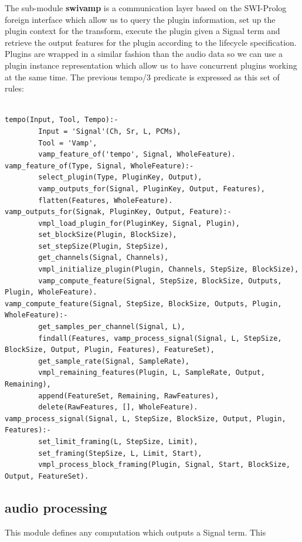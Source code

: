 \documentclass{llncs}
\begin{document}
The sub-module \textbf{swivamp} is a communication layer based on the SWI-Prolog foreign interface which allow us to query the plugin information, set up the plugin context for the transform, execute the plugin given a Signal term and retrieve the output features for the plugin according to the lifecycle specification. Plugins are wrapped in a similar fashion than the audio data so we can use a plugin instance representation which allow us to have concurrent plugins working at the same time. The previous tempo/3 predicate is expressed as this set of rules:

\begin{verbatim}

tempo(Input, Tool, Tempo):-
        Input = 'Signal'(Ch, Sr, L, PCMs),
        Tool = 'Vamp',
        vamp_feature_of('tempo', Signal, WholeFeature).
vamp_feature_of(Type, Signal, WholeFeature):-
        select_plugin(Type, PluginKey, Output),
        vamp_outputs_for(Signal, PluginKey, Output, Features),
        flatten(Features, WholeFeature).
vamp_outputs_for(Signak, PluginKey, Output, Feature):-
        vmpl_load_plugin_for(PluginKey, Signal, Plugin),
        set_blockSize(Plugin, BlockSize),
        set_stepSize(Plugin, StepSize),
        get_channels(Signal, Channels),
        vmpl_initialize_plugin(Plugin, Channels, StepSize, BlockSize),
        vamp_compute_feature(Signal, StepSize, BlockSize, Outputs, Plugin, WholeFeature).
vamp_compute_feature(Signal, StepSize, BlockSize, Outputs, Plugin, WholeFeature):-
        get_samples_per_channel(Signal, L),
        findall(Features, vamp_process_signal(Signal, L, StepSize, BlockSize, Output, Plugin, Features), FeatureSet),
        get_sample_rate(Signal, SampleRate),
        vmpl_remaining_features(Plugin, L, SampleRate, Output, Remaining),
        append(FeatureSet, Remaining, RawFeatures),
        delete(RawFeatures, [], WholeFeature).
vamp_process_signal(Signal, L, StepSize, BlockSize, Output, Plugin, Features):-
        set_limit_framing(L, StepSize, Limit),
        set_framing(StepSize, L, Limit, Start),
        vmpl_process_block_framing(Plugin, Signal, Start, BlockSize, Output, FeatureSet).

\end{verbatim}

\subsection{audio processing}

This module defines any computation which outputs a Signal term. This 
\end{document}
